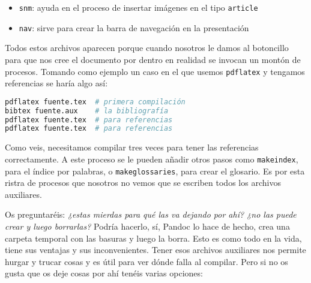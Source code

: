 \begin{itemize}
\item
  \lstinline!snm!: ayuda en el proceso de insertar imágenes en el tipo
  \lstinline!article!
\item
  \lstinline!nav!: sirve para crear la barra de navegación en la
  presentación
\end{itemize}

Todos estos archivos aparecen porque cuando nosotros le damos al
botoncillo para que nos cree el documento por dentro en realidad se
invocan un montón de procesos. Tomando como ejemplo un caso en el que
usemos \lstinline!pdflatex! y tengamos referencias se haría algo así:

\begin{lstlisting}[language=bash]
pdflatex fuente.tex  # primera compilación
bibtex fuente.aux    # la bibliografía
pdflatex fuente.tex  # para referencias 
pdflatex fuente.tex  # para referencias 
\end{lstlisting}

Como veis, necesitamos compilar tres veces para tener las referencias
correctamente. A este proceso se le pueden añadir otros pasos como
\lstinline!makeindex!, para el índice por palabras, o
\lstinline!makeglossaries!, para crear el glosario. Es por esta ristra
de procesos que nosotros no vemos que se escriben todos los archivos
auxiliares.

Os preguntaréis: \emph{¿estas mierdas para qué las va dejando por ahí?
¿no las puede crear y luego borrarlas?} Podría hacerlo, sí, Pandoc lo
hace de hecho, crea una carpeta temporal con las basuras y luego la
borra. Esto es como todo en la vida, tiene sus ventajas y sus
inconvenientes. Tener esos archivos auxiliares nos permite hurgar y
trucar cosas y es útil para ver dónde falla al compilar. Pero si no os
gusta que os deje cosas por ahí tenéis varias opciones:

